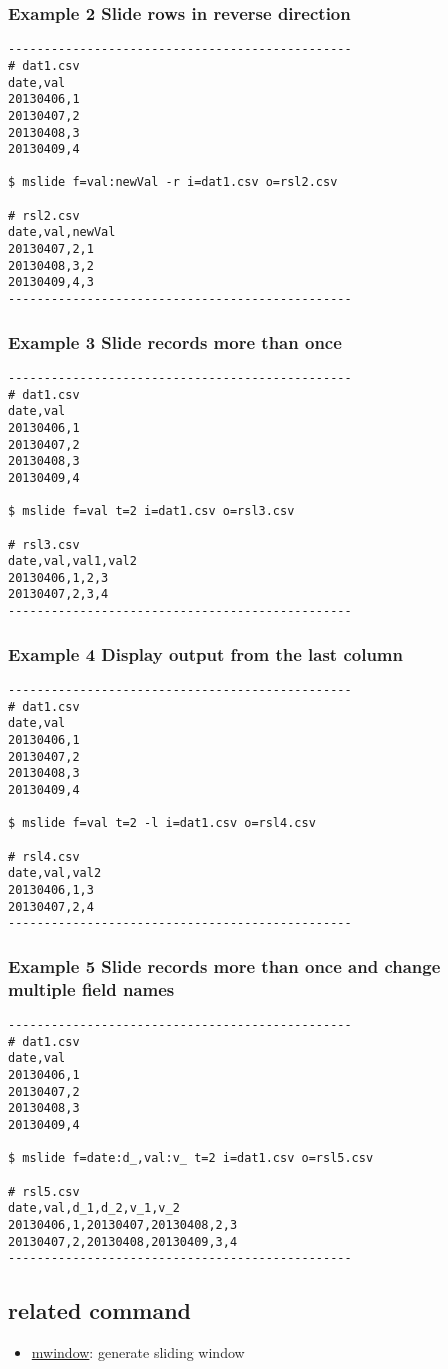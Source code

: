 \documentclass[a4paper]{jarticle}
\begin{document}
\subsubsection*{Example 2 Slide rows in reverse direction}

\begin{verbatim}
------------------------------------------------
# dat1.csv
date,val
20130406,1
20130407,2
20130408,3
20130409,4

$ mslide f=val:newVal -r i=dat1.csv o=rsl2.csv

# rsl2.csv
date,val,newVal
20130407,2,1
20130408,3,2
20130409,4,3
------------------------------------------------
\end{verbatim}

\subsubsection*{Example 3 Slide records more than once}

\begin{verbatim}
------------------------------------------------
# dat1.csv
date,val
20130406,1
20130407,2
20130408,3
20130409,4

$ mslide f=val t=2 i=dat1.csv o=rsl3.csv

# rsl3.csv
date,val,val1,val2
20130406,1,2,3
20130407,2,3,4
------------------------------------------------
\end{verbatim}

\subsubsection*{Example 4 Display output from the last column }

\begin{verbatim}
------------------------------------------------
# dat1.csv
date,val
20130406,1
20130407,2
20130408,3
20130409,4

$ mslide f=val t=2 -l i=dat1.csv o=rsl4.csv

# rsl4.csv
date,val,val2
20130406,1,3
20130407,2,4
------------------------------------------------
\end{verbatim}

\subsubsection*{Example 5 Slide records more than once and change multiple field names }

\begin{verbatim}
------------------------------------------------
# dat1.csv
date,val
20130406,1
20130407,2
20130408,3
20130409,4

$ mslide f=date:d_,val:v_ t=2 i=dat1.csv o=rsl5.csv

# rsl5.csv
date,val,d_1,d_2,v_1,v_2
20130406,1,20130407,20130408,2,3
20130407,2,20130408,20130409,3,4
------------------------------------------------
\end{verbatim}

\subsection*{related command}
\begin{itemize}
\item \href{run:mwindow.pdf}{mwindow}: generate sliding window
\end{itemize}
\end{document}
